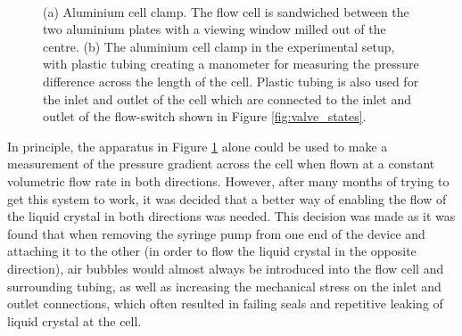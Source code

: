 \begin{figure}
\begin{center}
\\
\end{center}
\caption[Aluminium cell clamp]{\label{fig:case}(a) Aluminium cell clamp. The flow cell is sandwiched between the two aluminium plates with a viewing window milled out of the centre. (b) The aluminium cell clamp in the experimental setup, with plastic tubing creating a manometer for measuring the pressure difference across the length of the cell. Plastic tubing is also used for the inlet and outlet of the cell which are connected to the inlet and outlet of the flow-switch shown in Figure \ref{fig:valve_states}.}
\end{figure}

In principle, the apparatus in Figure \ref{fig:case} alone could be used to make a measurement of the pressure gradient across the cell when flown at a constant volumetric flow rate in both directions. However, after many months of trying to get this system to work, it was decided that a better way of enabling the flow of the liquid crystal in both directions was needed. This decision was made as it was found that when removing the syringe pump from one end of the device and attaching it to the other (in order to flow the liquid crystal in the opposite direction), air bubbles would almost always be introduced into the flow cell and surrounding tubing, as well as increasing the mechanical stress on the inlet and outlet connections, which often resulted in failing seals and repetitive leaking of liquid crystal at the cell.

